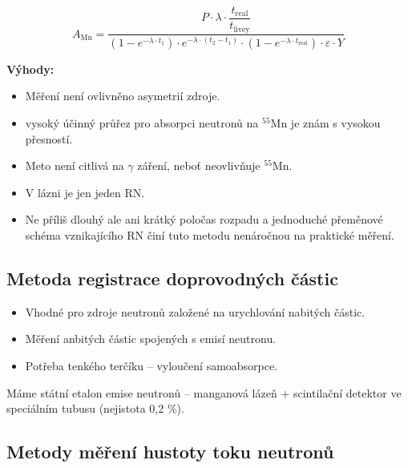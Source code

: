 \begin{equation}
    A_{\text{Mn}} = \dfrac{P\cdot \lambda \cdot \dfrac{t_{\text{real}}}{t_{\text{livey}}}}{(1 - e^{-\lambda \cdot t_1}) \cdot e^{-\lambda \cdot (t_2 - t_1)} \cdot (1 - e^{-\lambda \cdot t_{\text{real}}}) \cdot \varepsilon \cdot Y}
\end{equation}

\textbf{Výhody:}

\begin{itemize}
    \item Měření není ovlivněno asymetrií zdroje.
    \item vysoký účinný průřez pro absorpci neutronů na $^{55}$Mn je znám s vysokou přesností.
    \item Meto není citlivá na $\gamma$ záření, neboť neovlivňuje $^{55}$Mn.
    \item V lázni je jen jeden RN.
    \item Ne příliš dlouhý ale ani krátký poločas rozpadu a jednoduché přeměnové schéma vznikajícího RN činí tuto metodu nenáročnou na praktické měření.
\end{itemize}

\subsection{Metoda registrace doprovodných částic}

\begin{itemize}
    \item Vhodné pro zdroje neutronů založené na urychlování nabitých částic.
    \item Měření anbitých částic spojených s emisí neutronu.
    \item Potřeba tenkého terčíku -- vyloučení samoabsorpce.
    
\end{itemize}

Máme státní etalon emise neutronů -- manganová lázeň + scintilační detektor ve speciálním tubusu (nejistota 0,2 \%).

\subsection{Metody měření hustoty toku neutronů}

